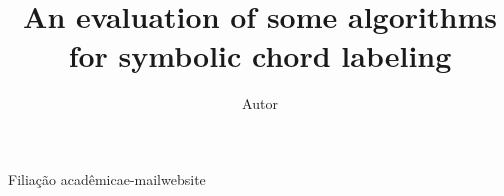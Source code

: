 \documentclass{article}
\begin{document}
\graphicspath{{figs/}{data/}}

\title{An evaluation of some algorithms for symbolic chord labeling}
\author{Autor}{Filiação acadêmica}{e-mail}{website}

\begin{abstract}

\end{abstract}






\end{document}
